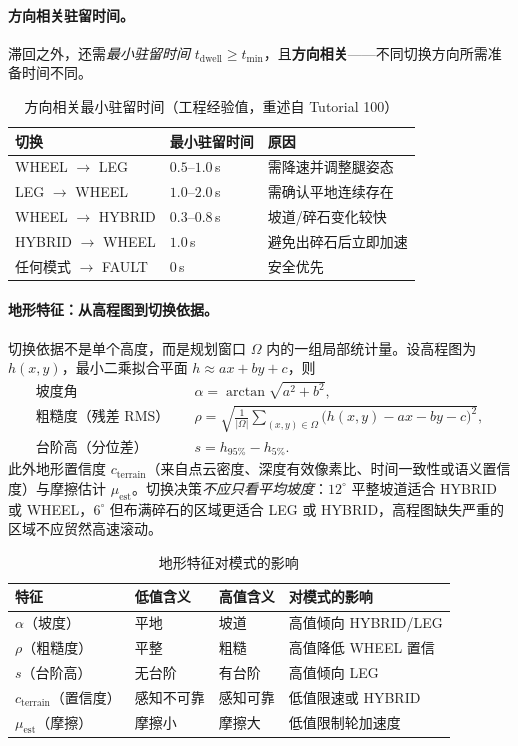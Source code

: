 \paragraph{方向相关驻留时间。}
滞回之外，还需\emph{最小驻留时间} $t_{\mathrm{dwell}}\ge t_{\min}$，且\textbf{方向相关}——不同切换方向所需准备时间不同。

\begin{table}[H]\centering\small
\caption{方向相关最小驻留时间（工程经验值，重述自 Tutorial 100）}
\label{tab:wlm-dwell}
\begin{tabular}{lll}
\toprule
切换 & 最小驻留时间 & 原因 \\
\midrule
WHEEL $\to$ LEG & $0.5$–$1.0\,$s & 需降速并调整腿姿态 \\
LEG $\to$ WHEEL & $1.0$–$2.0\,$s & 需确认平地连续存在 \\
WHEEL $\to$ HYBRID & $0.3$–$0.8\,$s & 坡道/碎石变化较快 \\
HYBRID $\to$ WHEEL & $1.0\,$s & 避免出碎石后立即加速 \\
任何模式 $\to$ FAULT & $0\,$s & 安全优先 \\
\bottomrule
\end{tabular}
\end{table}

\paragraph{地形特征：从高程图到切换依据。}
切换依据不是单个高度，而是规划窗口 $\Omega$ 内的一组局部统计量。设高程图为 $h(x,y)$，最小二乘拟合平面 $h\approx ax+by+c$，则
\begin{align}
  \text{坡度角}\quad&\alpha=\arctan\sqrt{a^2+b^2},\label{eq:wlm-slope}\\
  \text{粗糙度（残差 RMS）}\quad&\rho=\sqrt{\frac1{|\Omega|}\sum_{(x,y)\in\Omega}\big(h(x,y)-ax-by-c\big)^2},\label{eq:wlm-rough}\\
  \text{台阶高（分位差）}\quad&s=h_{95\%}-h_{5\%}.\label{eq:wlm-step}
\end{align}
此外地形置信度 $c_{\mathrm{terrain}}$（来自点云密度、深度有效像素比、时间一致性或语义置信度）与摩擦估计 $\mu_{\mathrm{est}}$。切换决策\emph{不应只看平均坡度}：$12^\circ$ 平整坡道适合 HYBRID 或 WHEEL，$6^\circ$ 但布满碎石的区域更适合 LEG 或 HYBRID，高程图缺失严重的区域不应贸然高速滚动。

\begin{table}[H]\centering\small
\caption{地形特征对模式的影响}
\label{tab:wlm-terrain}
\begin{tabular}{llll}
\toprule
特征 & 低值含义 & 高值含义 & 对模式的影响 \\
\midrule
$\alpha$（坡度） & 平地 & 坡道 & 高值倾向 HYBRID/LEG \\
$\rho$（粗糙度） & 平整 & 粗糙 & 高值降低 WHEEL 置信 \\
$s$（台阶高） & 无台阶 & 有台阶 & 高值倾向 LEG \\
$c_{\mathrm{terrain}}$（置信度） & 感知不可靠 & 感知可靠 & 低值限速或 HYBRID \\
$\mu_{\mathrm{est}}$（摩擦） & 摩擦小 & 摩擦大 & 低值限制轮加速度 \\
\bottomrule
\end{tabular}
\end{table}

